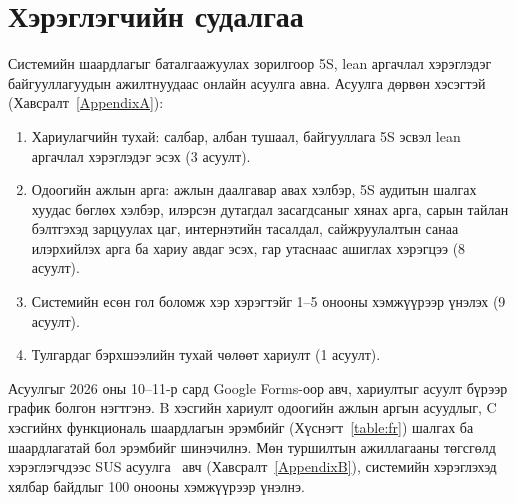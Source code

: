 \section{Хэрэглэгчийн судалгаа}
Системийн шаардлагыг баталгаажуулах зорилгоор 5S, lean аргачлал хэрэглэдэг байгууллагуудын ажилтнуудаас онлайн асуулга авна. Асуулга дөрвөн хэсэгтэй (Хавсралт~\ref{AppendixA}):
\begin{enumerate}[label=\Alph*.]
    \item Хариулагчийн тухай: салбар, албан тушаал, байгууллага 5S эсвэл lean аргачлал хэрэглэдэг эсэх (3 асуулт).
    \item Одоогийн ажлын арга: ажлын даалгавар авах хэлбэр, 5S аудитын шалгах хуудас бөглөх хэлбэр, илэрсэн дутагдал засагдсаныг хянах арга, сарын тайлан бэлтгэхэд зарцуулах цаг, интернэтийн тасалдал, сайжруулалтын санаа илэрхийлэх арга ба хариу авдаг эсэх, гар утаснаас ашиглах хэрэгцээ (8 асуулт).
    \item Системийн есөн гол боломж хэр хэрэгтэйг 1--5 онооны хэмжүүрээр үнэлэх (9 асуулт).
    \item Тулгардаг бэрхшээлийн тухай чөлөөт хариулт (1 асуулт).
\end{enumerate}
Асуулгыг 2026 оны 10--11-р сард Google Forms-оор авч, хариултыг асуулт бүрээр график болгон нэгтгэнэ. B хэсгийн хариулт одоогийн ажлын аргын асуудлыг, C хэсгийнх функциональ шаардлагын эрэмбийг (Хүснэгт~\ref{table:fr}) шалгах ба шаардлагатай бол эрэмбийг шинэчилнэ. Мөн туршилтын ажиллагааны төгсгөлд хэрэглэгчдээс SUS асуулга~\cite{brooke} авч (Хавсралт~\ref{AppendixB}), системийн хэрэглэхэд хялбар байдлыг 100 онооны хэмжүүрээр үнэлнэ.

